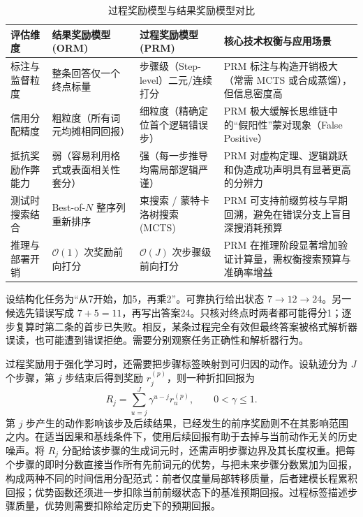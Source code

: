 \documentclass[../textbook.tex]{subfiles}
\begin{document}
\begin{table}[htbp]
\centering
\caption{过程奖励模型与结果奖励模型对比}
\label{tab:prm-vs-orm}
\begin{tabularx}{\linewidth}{lp{30mm}p{30mm}X}
\toprule
评估维度 & 结果奖励模型 (ORM) & 过程奖励模型 (PRM) & 核心技术权衡与应用场景 \\
\midrule
标注与监督粒度 & 整条回答仅一个终点标量 & 步骤级（Step-level）二元/连续打分 & PRM 标注与构造开销极大（常需 MCTS 或合成蒸馏），但信息密度高 \\
信用分配精度 & 粗粒度（所有词元均摊相同回报） & 细粒度（精确定位首个逻辑错误步） & PRM 极大缓解长思维链中的“假阳性”蒙对现象（False Positive） \\
抵抗奖励作弊能力 & 弱（容易利用格式或表面相关性套分） & 强（每一步推导均需局部逻辑严谨） & PRM 对虚构定理、逻辑跳跃和伪造成功声明具有显著更高的分辨力 \\
测试时搜索结合 & Best-of-$N$ 整序列重新排序 & 束搜索 / 蒙特卡洛树搜索 (MCTS) & PRM 可支持前缀剪枝与早期回溯，避免在错误分支上盲目深搜消耗预算 \\
推理与部署开销 & $\mathcal{O}(1)$ 次奖励前向打分 & $\mathcal{O}(J)$ 次步骤级前向打分 & PRM 在推理阶段显著增加验证计算量，需权衡搜索预算与准确率增益 \\
\bottomrule
\end{tabularx}
\end{table}

设结构化任务为“从7开始，加5，再乘2”。可靠执行给出状态 $7\to12\to24$。另一候选先错误写成 $7+5=11$，再写出答案24。只核对终点时两者都可能得分1；逐步复算时第二条的首步已失败。相反，某条过程完全有效但最终答案被格式解析器误读，也可能遭到错误拒绝。需要分别观察任务正确性和解析器行为。

过程奖励用于强化学习时，还需要把步骤标签映射到可归因的动作。设轨迹分为 $J$ 个步骤，第 $j$ 步结束后得到奖励 $r_j^{(p)}$，则一种折扣回报为
\begin{equation}
 R_j=\sum_{u=j}^{J}\gamma^{u-j}r_u^{(p)},\qquad 0<\gamma\leq1.
\end{equation}
第 $j$ 步产生的动作影响该步及后续结果，已经发生的前序奖励则不在其影响范围之内。在适当因果和基线条件下，使用后续回报有助于去掉与当前动作无关的历史噪声。将 $R_j$ 分配给该步骤的生成词元时，还需声明步骤边界及其长度权重。把每个步骤的即时分数直接当作所有先前词元的优势，与把未来步骤分数累加为回报，构成两种不同的时间信用分配范式：前者仅度量局部转移质量，后者建模长程累积回报；优势函数还须进一步扣除当前前缀状态下的基准预期回报。过程标签描述步骤质量，优势则需要扣除给定历史下的预期回报。
\end{document}

